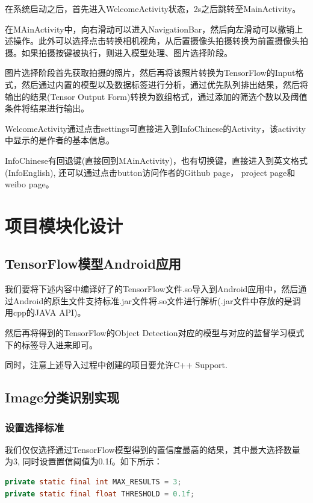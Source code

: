 \documentclass[UTF8, Microsoft YaHei]{book}
\begin{document}
    在系统启动之后，首先进入WelcomeActivity状态，2s之后跳转至MainActivity。

    在MAinActivity中，向右滑动可以进入NavigationBar，然后向左滑动可以撤销上述操作。此外可以选择点击转换相机视角，从后置摄像头拍摄转换为前置摄像头拍摄。如果拍摄按键被执行，则进入模型处理、图片选择阶段。

    图片选择阶段首先获取拍摄的照片，然后再将该照片转换为TensorFlow的Input格式，然后通过内置的模型以及数据标签进行分析，通过优先队列排出结果，然后将输出的结果(Tensor Output Form)转换为数组格式，通过添加的筛选个数以及阈值条件将结果进行输出。

    WelcomeActivity通过点击settings可直接进入到InfoChinese的Activity，该activity中显示的是作者的基本信息。

    InfoChinese有回退键(直接回到MAinActivity)，也有切换键，直接进入到英文格式(InfoEnglish), 还可以通过点击button访问作者的Github page， project page和weibo page。 

    \chapter{项目模块化设计}
    \section{TensorFlow模型Android应用}
    我们要将下述内容中编译好了的TensorFlow文件.so导入到Android应用中，然后通过Android的原生文件支持标准.jar文件将.so文件进行解析(.jar文件中存放的是调用cpp的JAVA API)。

    然后再将得到的TensorFlow的Object Detection对应的模型与对应的监督学习模式下的标签导入进来即可。

    同时，注意上述导入过程中创建的项目要允许C++ Support.
    
    \section{Image分类识别实现}
    \subsection{设置选择标准}
    我们仅仅选择通过TensorFlow模型得到的置信度最高的结果，其中最大选择数量为3, 同时设置置信阈值为0.1f。如下所示：

\begin{small}
\begin{lstlisting}[language=java]
private static final int MAX_RESULTS = 3;
private static final float THRESHOLD = 0.1f;
\end{lstlisting}
\end{small}
\end{document}
